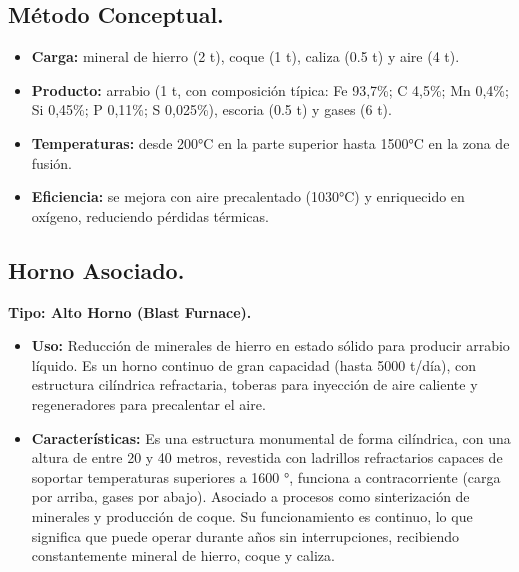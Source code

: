 \documentclass[12pt,a4paper]{article}
\begin{document}
\subsection{Método Conceptual.}

\begin{itemize}
    \item \textbf{Carga:} mineral de hierro (2 t), coque (1 t), caliza (0.5 t) y aire (4 t).
    \item \textbf{Producto:} arrabio (1 t, con composición típica: Fe 93,7\%; C 4,5\%; Mn 0,4\%; Si 0,45\%; P 0,11\%; S 0,025\%), escoria (0.5 t) y gases (6 t).
    \item \textbf{Temperaturas:} desde 200°C en la parte superior hasta 1500°C en la zona de fusión.
    \item \textbf{Eficiencia:} se mejora con aire precalentado (1030°C) y enriquecido en oxígeno, reduciendo pérdidas térmicas.
\end{itemize}

\subsection{Horno Asociado.} \label{asociados}

\textbf{Tipo: Alto Horno (Blast Furnace).}

\begin{itemize}
    \item \textbf{Uso:} Reducción de minerales de hierro en estado sólido para producir arrabio líquido. Es un horno continuo de gran capacidad (hasta 5000 t/día), con estructura cilíndrica refractaria, toberas para inyección de aire caliente y regeneradores para precalentar el aire.
    \item \textbf{Características:} Es una estructura monumental de forma cilíndrica, con una altura de entre 20 y 40 metros, revestida con ladrillos refractarios capaces de soportar temperaturas superiores a 1600 °, funciona a contracorriente (carga por arriba, gases por abajo). Asociado a procesos como sinterización de minerales y producción de coque. Su funcionamiento es continuo, lo que significa que puede operar durante años sin interrupciones, recibiendo constantemente mineral de hierro, coque y caliza.
\end{itemize}
\end{document}
